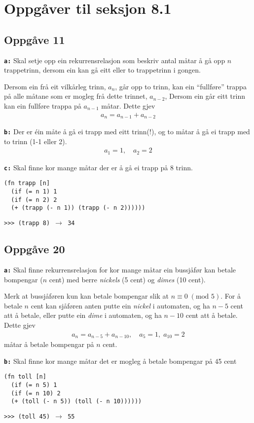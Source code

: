 \documentclass[a4paper, 11pt]{article}
\newcommand{\Modulo}{\text{mod }}
\newcommand{\deloppg}[1]{\vspace{1mm}\noindent \textbf{\tt \themecolor{#1:}}}
\newcommand{\themeshade}{Mahogany}
\newcommand{\themecolor}[1]{\textcolor{\themeshade}{#1}}
\begin{document}
\newpage
\section*{Oppgåver til seksjon 8.1}
\subsection*{Oppgåve 11}
\deloppg{a} Skal setje opp ein rekurrensrelasjon som beskriv antal måtar å gå opp \(n\) trappetrinn,
dersom ein kan gå eitt eller to trappetrinn i gongen.

Dersom ein frå eit vilkårleg trinn, \(a_n\), går opp to trinn,
kan ein ``fullføre'' trappa på alle måtane som er mogleg frå dette trinnet, \(a_{n-2}\),
Dersom ein går eitt trinn kan ein fullføre trappa på \(a_{n-1}\) måtar. Dette gjev
\begin{align*}
    a_n = a_{n-1}+a_{n-2}
\end{align*}

\deloppg{b} Der er éin måte å gå ei trapp med eitt trinn(!), og to måtar å gå ei trapp med to trinn (1-1 eller 2).
\begin{align*}
    a_1 = 1, \quad a_2 = 2
\end{align*}

\deloppg{c} Skal finne kor mange måtar der er å gå ei trapp på 8 trinn.
\begin{lstlisting}[language=Lie]
(fn trapp [n]
  (if (= n 1) 1
  (if (= n 2) 2
  (+ (trapp (- n 1)) (trapp (- n 2))))))
\end{lstlisting}
{\tt >>> (trapp 8) \(\rightarrow\) 34}


\subsection*{Oppgåve 20}
\deloppg{a} Skal finne rekurrensrelasjon for kor mange måtar ein bussjåfør kan betale bompengar (\(n\) cent) med berre
{\em nickels} (5 cent) og {\em dimes} (10 cent).

Merk at bussjåføren kun kan betale bompengar slik at \(n \equiv 0 \;(\Modulo 5)\).
For å betale \(n\) cent kan sjåføren anten putte ein {\em nickel} i automaten, og
ha \(n - 5\) cent att å betale, eller putte ein {\em dime} i automaten, og ha \(n - 10\)
cent att å betale. Dette gjev
\begin{align*}
    a_n = a_{n - 5} + a_{n - 10}, \quad a_5 = 1, \; a_{10} = 2
\end{align*}
måtar å betale bompengar på \(n\) cent.

\deloppg{b} Skal finne kor mange måtar det er mogleg å betale bompengar på 45 cent
\begin{lstlisting}[language=Lie]
(fn toll [n]
  (if (= n 5) 1
  (if (= n 10) 2
  (+ (toll (- n 5)) (toll (- n 10))))))
\end{lstlisting}
{\tt >>> (toll 45) \(\rightarrow\) 55}
\end{document}

